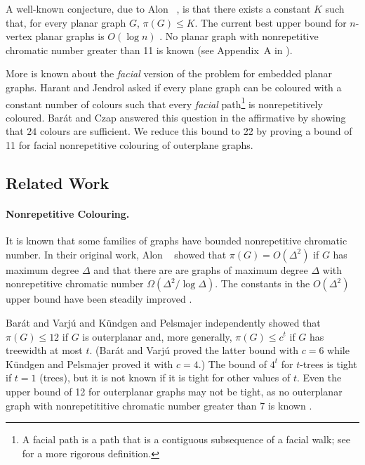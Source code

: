 \documentclass{cccg16}
\begin{document}
A well-known conjecture, due to Alon \etal\ \cite{alon2002nonrepetitive},
is that there exists a constant $K$ such that, for every planar graph
$G$, $\pi(G) \leq K$.  The current best upper bound for $n$-vertex planar
graphs is $O(\log n)$ \cite{dujmovic2012planarlogn}. No planar graph with
nonrepetitive chromatic number greater than 11 is known (see Appendix~A
in \cite{dujmovic2012planarlogn}).

More is known about the \emph{facial} version of the problem for embedded
planar graphs.  Harant and Jendrol \cite{harant2012nonrepetitive} asked
if every plane graph can be coloured with a constant number of colours
such that every \emph{facial} path\footnote{A facial path is a path that
is a contiguous subsequence of a facial walk; see 
for a more rigorous definition.} is nonrepetitively coloured.  Barát and
Czap \cite{barat2013facial} answered this question in the affirmative
by showing that $24$ colours are sufficient.  We reduce this bound
to 22 by proving a bound of 11 for facial nonrepetitive colouring of
outerplane graphs.

\subsection{Related Work}

\paragraph{Nonrepetitive Colouring.}

It is known that some families of graphs have bounded
nonrepetitive chromatic number.  In their original work,
Alon \etal\ \cite{alon2002nonrepetitive} showed that $\pi(G) =
O(\Delta^2)$ if $G$ has maximum degree $\Delta$ and that there
are are graphs of maximum degree $\Delta$ with nonrepetitive
chromatic number $\Omega(\Delta^2/\log \Delta)$.  The constants
in the $O(\Delta^2)$ upper bound have been steadily improved
\cite{dujmovic2011nonrepetitive,grytczuk2007nonrepetitivesurvey,grytczuk2007nonrepetitive,harant2012nonrepetitive}.

Barát and Varjú \cite{barat2007square} and K{\"u}ndgen and Pelsmajer
\cite{kundgen2008nonrepetitive} independently showed that $\pi(G)\le
12$ if $G$ is outerplanar and, more generally, $\pi(G)\le c^t$ if $G$
has treewidth at most $t$.  (Barát and Varjú proved the latter bound
with $c=6$ while K{\"u}ndgen and Pelsmajer proved it with $c=4$.)
The bound of $4^t$ for $t$-trees is tight if $t=1$ (trees), but it
is not known if it is tight for other values of $t$. Even the upper
bound of 12 for outerplanar graphs may not be tight, as no outerplanar
graph with nonrepetititive chromatic number greater than 7 is known
\cite{barat2007square}.
\end{document}
